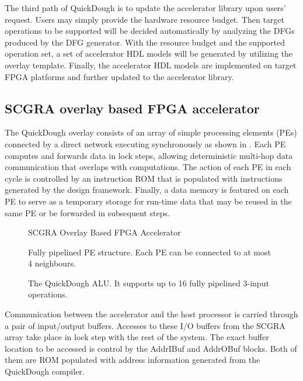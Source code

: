 The third path of QuickDough is to update the accelerator library upon users' 
request. Users may simply provide the hardware resource budget. 
Then target operations to be supported will be decided automatically by analyzing
the DFGs produced by the DFG generator. With the resource budget and the supported 
operation set, a set of accelerator HDL models will be generated by utilizing the 
overlay template. Finally, the accelerator HDL models are implemented on target 
FPGA platforms and further updated to the accelerator library.

\subsection{SCGRA overlay based FPGA accelerator}
The QuickDough overlay consists of an array of simple processing 
elements (PEs) connected by a direct network executing 
synchronously as shown in .
Each PE computes and forwards data in lock steps, allowing deterministic 
multi-hop data communication that overlaps with computations.
The action of each PE in each cycle is controlled by an instruction 
ROM that is populated with instructions generated by the design framework.
Finally, a data memory is featured on each PE to serve as a temporary 
storage for run-time data that may be reused in the same PE or be 
forwarded in subsequent steps.

\begin{figure}[tb]
    \caption{SCGRA Overlay Based FPGA Accelerator}
    \label{fig:scgra-accelerator}
\end{figure}

\begin{figure}[tb]
\center{\texttt{[image: pe]}}
\caption{Fully pipelined PE structure. Each PE can be connected to at most 4 neighbours.}
\label{fig:pe}
\end{figure}

\begin{figure}[tb]
\caption{The QuickDough ALU. It supports up to 16 fully pipelined 3-input operations.}
\label{fig:ALU}
\end{figure} 

Communication between the accelerator and the host processor is 
carried through a pair of input/output buffers.
Accesses to these I/O buffers from the SCGRA array take place in 
lock step with the rest of the system.
The exact buffer location to be accessed is control by the 
AddrIBuf and AddrOBuf blocks. Both of them are ROM populated with 
address information generated from the QuickDough compiler.

